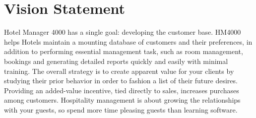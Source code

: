 \section{Vision Statement}
Hotel Manager 4000 has a single goal: developing the customer base. HM4000 helps Hotels maintain a mounting database of customers and their preferences, in addition to performing essential management task, such as room management, bookings and generating detailed reports quickly and easily with minimal training. The overall strategy is to create apparent value for your clients by studying
their prior behavior in order to fashion a list of their future desires. Providing an added-value incentive, tied directly to sales, increases purchases among customers. Hospitality management is about growing the relationships with your guests, so spend more time pleasing guests than learning software.
